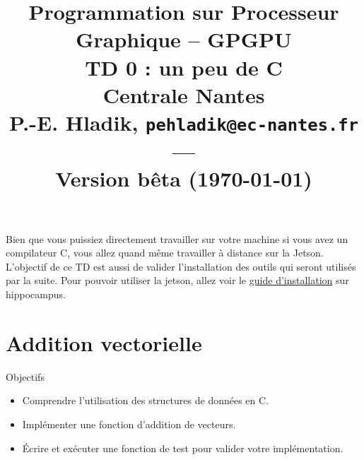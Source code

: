 

\title{{\Large Programmation sur Processeur Graphique -- GPGPU }\\
\vspace{-0.4em}
{\large TD 0 : un peu de C}\\
{\small Centrale Nantes}\\
\small P.-E. Hladik, \small{\texttt{pehladik@ec-nantes.fr}}\\
---\\
{\scriptsize  Version bêta (\today)}\\
}



\maketitle


\begin{ad}[]{}
 \begin{itemize}
	Bien que vous puissiez directement travailler sur votre machine si vous avez un compilateur C, vous allez quand même travailler à distance sur la Jetson. L'objectif de ce TD est aussi de valider l'installation des outils qui seront utilisés par la suite. Pour pouvoir utiliser la jetson, allez voir le \href{https://gitlab.univ-nantes.fr/hladik-pe-1/ecn-gpu-cours/-/blob/main/HowTo/Hwt1-remote/GPGPU_Hwt_remote.pdf}{guide d'installation} sur hippocampus.
\end{itemize}
\end{ad}

  \section{Addition vectorielle}

\begin{objectif}[]{Objectifs}
\begin{itemize}
\item Comprendre l'utilisation des structures de donn\'ees en C.
\item Impl\'ementer une fonction d'addition de vecteurs.
\item \'Ecrire et ex\'ecuter une fonction de test pour valider votre impl\'ementation.
\end{itemize}
\end{objectif}

